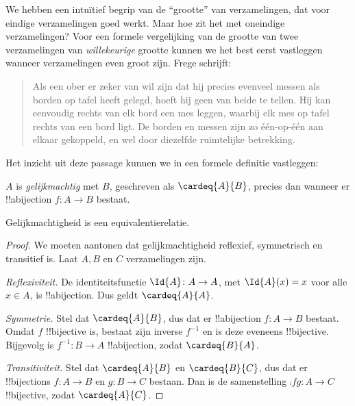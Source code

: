 \documentclass[../../../include/open-logic-section]{subfiles}
\begin{document}


We hebben een intuïtief begrip van de ``grootte'' van verzamelingen, dat voor
eindige verzamelingen goed werkt. Maar hoe zit het met oneindige verzamelingen?
Voor een formele vergelijking van de grootte van twee verzamelingen van
\emph{willekeurige} grootte kunnen we het best eerst vastleggen wanneer
verzamelingen even groot zijn. Frege schrijft:
\begin{quote}
  Als een ober er zeker van wil zijn dat hij precies evenveel messen als
  borden op tafel heeft gelegd, hoeft hij geen van beide te tellen. Hij kan
  eenvoudig rechts van elk bord een mes leggen, waarbij elk mes op tafel
  rechts van een bord ligt. De borden en messen zijn zo één-op-één aan elkaar
  gekoppeld, en wel door diezelfde ruimtelijke betrekking. \citep[\S70]{Frege1884}
\end{quote}
Het inzicht uit deze passage kunnen we in een formele definitie vastleggen:

\begin{defn}
  $A$ is \emph{gelijkmachtig} met $B$, geschreven als $\cardeq{A}{B}$,
  precies dan wanneer er !!a{bijection} $f \colon A \to B$ bestaat.
\end{defn}

\begin{prop}
Gelijkmachtigheid is een equivalentierelatie.
\end{prop}

\begin{proof} 
We moeten aantonen dat gelijkmachtigheid reflexief, symmetrisch en transitief
is. Laat $A, B$ en $C$ verzamelingen zijn.

\emph{Reflexiviteit.} De identiteitsfunctie $\Id{A} \colon A \to A$, met
$\Id{A} (x) = x$ voor alle $x \in A$, is !!a{bijection}. Dus geldt
$\cardeq{A}{A}$.

\emph{Symmetrie.} Stel dat $\cardeq{A}{B}$, dus dat er !!a{bijection}
$f\colon A \to B$ bestaat. Omdat $f$ !!{bijective} is, bestaat zijn inverse
$f^{-1}$ en is deze eveneens !!{bijective}. Bijgevolg is
$f^{-1}\colon B \to A$ !!a{bijection}, zodat $\cardeq{B}{A}$.

\emph{Transitiviteit.} Stel dat $\cardeq{A}{B}$ en $\cardeq{B}{C}$, dus dat
er !!{bijection}s $f\colon A \to B$ en $g\colon B \to C$ bestaan. Dan is de
samenstelling $\comp{f}{g}\colon A \to C$ !!{bijective}, zodat
$\cardeq{A}{C}$.
\end{proof}
\end{document}
